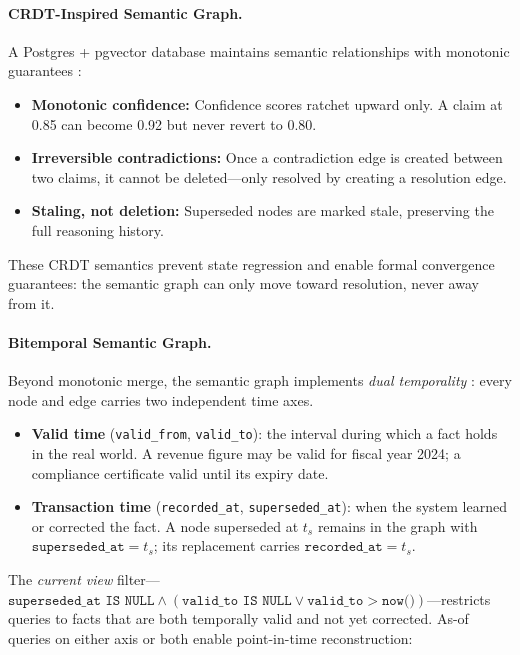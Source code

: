 \documentclass[11pt]{article}
\begin{document}
\paragraph{CRDT-Inspired Semantic Graph.}
A Postgres + pgvector database maintains semantic relationships with monotonic guarantees \cite{laddad2024}:

\begin{itemize}
  \item \textbf{Monotonic confidence:} Confidence scores ratchet upward only. A claim at 0.85 can become 0.92 but never revert to 0.80.
  \item \textbf{Irreversible contradictions:} Once a contradiction edge is created between two claims, it cannot be deleted---only resolved by creating a resolution edge.
  \item \textbf{Staling, not deletion:} Superseded nodes are marked stale, preserving the full reasoning history.
\end{itemize}

These CRDT semantics prevent state regression and enable formal convergence guarantees: the semantic graph can only move toward resolution, never away from it.

\paragraph{Bitemporal Semantic Graph.}
Beyond monotonic merge, the semantic graph implements \emph{dual temporality} \cite{snodgrass2000}: every node and edge carries two independent time axes.

\begin{itemize}
  \item \textbf{Valid time} (\texttt{valid\_from}, \texttt{valid\_to}): the interval during which a fact holds in the real world. A revenue figure may be valid for fiscal year 2024; a compliance certificate valid until its expiry date.
  \item \textbf{Transaction time} (\texttt{recorded\_at}, \texttt{superseded\_at}): when the system learned or corrected the fact. A node superseded at $t_s$ remains in the graph with $\texttt{superseded\_at} = t_s$; its replacement carries $\texttt{recorded\_at} = t_s$.
\end{itemize}

The \emph{current view} filter---$\texttt{superseded\_at IS NULL} \wedge (\texttt{valid\_to IS NULL} \vee \texttt{valid\_to} > \texttt{now()})$---restricts queries to facts that are both temporally valid and not yet corrected. As-of queries on either axis or both enable point-in-time reconstruction:
\end{document}
